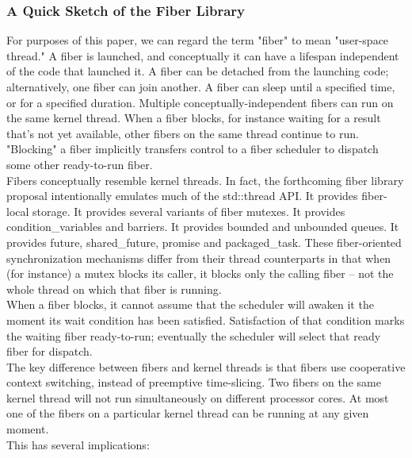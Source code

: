 \subsubsection*{A Quick Sketch of the Fiber Library}
For purposes of this paper, we can regard the term "fiber" to mean "user-space
thread." A fiber is launched, and conceptually it can have a lifespan
independent of the code that launched it. A fiber can be detached from the
launching code; alternatively, one fiber can join another. A fiber can sleep
until a specified time, or for a specified duration. Multiple
conceptually-independent fibers can run on the same kernel thread. When a
fiber blocks, for instance waiting for a result that's not yet available,
other fibers on the same thread continue to run. "Blocking" a fiber implicitly
transfers control to a fiber scheduler to dispatch some other ready-to-run
fiber.\\
\newline
Fibers conceptually resemble kernel threads. In fact, the forthcoming fiber
library proposal intentionally emulates much of the std::thread API. It
provides fiber-local storage. It provides several variants of fiber mutexes.
It provides condition\_variables and barriers. It provides bounded and
unbounded queues. It provides future, shared\_future, promise and
packaged\_task. These fiber-oriented synchronization mechanisms differ from
their thread counterparts in that when (for instance) a mutex blocks its
caller, it blocks only the calling fiber -- not the whole thread on which that
fiber is running.\\
\newline
When a fiber blocks, it cannot assume that the scheduler will awaken it the
moment its wait condition has been satisfied. Satisfaction of that condition
marks the waiting fiber ready-to-run; eventually the scheduler will select
that ready fiber for dispatch.\\
\newline
The key difference between fibers and kernel threads is that fibers use
cooperative context switching, instead of preemptive time-slicing. Two fibers
on the same kernel thread will not run simultaneously on different processor
cores. At most one of the fibers on a particular kernel thread can be running
at any given moment.\\
\newline
This has several implications:
